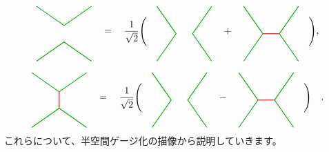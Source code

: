 \documentclass[report,paper=a4, fontsize=12pt, line_length=16cm, number_of_lines=33,dvipdfmx]{jlreq}
\numberwithin{equation}{chapter}
\begin{document}
\begin{align}
  \begin{tikzpicture}[baseline=0]
      \coordinate(A) at (-1,-1);
      \coordinate(B) at (1,-1);
      \coordinate(C) at (1,1);
      \coordinate(D) at (-1,1);
      \draw[darkgreen,thick] (D)--(0,0.3)--(C);
      \draw[darkgreen,thick] (A)--(0,-0.3)--(B);
  \end{tikzpicture}
  \quad=\quad \frac{1}{\sqrt{2}}\Bigg(
  \quad
  \begin{tikzpicture}[baseline=0]
      \coordinate(A) at (-1,-1);
      \coordinate(B) at (1,-1);
      \coordinate(C) at (1,1);
      \coordinate(D) at (-1,1);
      \draw[darkgreen,thick] (D)--(-0.3,0)--(A);
      \draw[darkgreen,thick] (C)--(0.3,0)--(B);
  \end{tikzpicture}
  \quad
  +
  \quad
  \begin{tikzpicture}[baseline=0]
      \coordinate(A) at (-1,-1);
      \coordinate(B) at (1,-1);
      \coordinate(C) at (1,1);
      \coordinate(D) at (-1,1);
      \draw[darkgreen,thick] (D)--(-0.3,0)--(A);
      \draw[darkgreen,thick] (C)--(0.3,0)--(B);
      \draw[red,thick] (0.3,0)--(-0.3,0);
  \end{tikzpicture}
  \quad
  \Bigg),\label{crossing3}
\end{align}

\begin{align}
  \begin{tikzpicture}[baseline=0]
      \coordinate(A) at (-1,-1);
      \coordinate(B) at (1,-1);
      \coordinate(C) at (1,1);
      \coordinate(D) at (-1,1);
      \draw[darkgreen,thick] (D)--(0,0.3)--(C);
      \draw[darkgreen,thick] (A)--(0,-0.3)--(B);
      \draw[red,thick] (0,0.3)--(0,-0.3);
  \end{tikzpicture}
  \quad=\quad \frac{1}{\sqrt{2}}\Bigg(
  \quad
  \begin{tikzpicture}[baseline=0]
      \coordinate(A) at (-1,-1);
      \coordinate(B) at (1,-1);
      \coordinate(C) at (1,1);
      \coordinate(D) at (-1,1);
      \draw[darkgreen,thick] (D)--(-0.3,0)--(A);
      \draw[darkgreen,thick] (C)--(0.3,0)--(B);
  \end{tikzpicture}
  \quad
  -
  \quad
  \begin{tikzpicture}[baseline=0]
      \coordinate(A) at (-1,-1);
      \coordinate(B) at (1,-1);
      \coordinate(C) at (1,1);
      \coordinate(D) at (-1,1);
      \draw[darkgreen,thick] (D)--(-0.3,0)--(A);
      \draw[darkgreen,thick] (C)--(0.3,0)--(B);
      \draw[red,thick] (0.3,0)--(-0.3,0);
  \end{tikzpicture}
  \quad
  \Bigg)\quad .
  \label{crossing4}
\end{align}
これらについて、半空間ゲージ化の描像から説明していきます。
\end{document}
